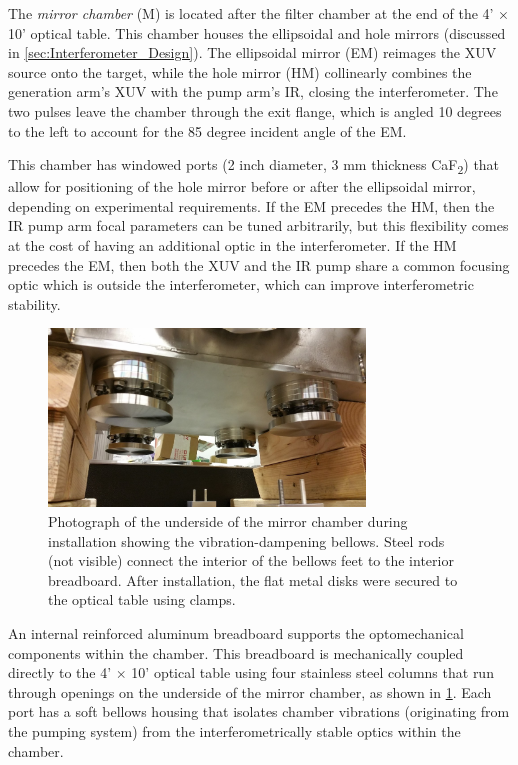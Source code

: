 The \textit{mirror chamber} (M) is located after the filter chamber at the end of the 4' $\times$ 10' optical table. This chamber houses the ellipsoidal and hole mirrors (discussed in \cref{sec:Interferometer_Design}). The ellipsoidal mirror (EM) reimages the XUV source onto the target, while the hole mirror (HM) collinearly combines the generation arm's XUV with the pump arm's IR, closing the interferometer. The two pulses leave the chamber through the exit flange, which is angled 10 degrees to the left to account for the 85 degree incident angle of the EM.

This chamber has windowed ports (2 inch diameter, 3 mm thickness CaF\textsubscript{2}) that allow for positioning of the hole mirror before or after the ellipsoidal mirror, depending on experimental requirements. If the EM precedes the HM, then the IR pump arm focal parameters can be tuned arbitrarily, but this flexibility comes at the cost of having an additional optic in the interferometer. If the HM precedes the EM, then both the XUV and the IR pump share a common focusing optic which is outside the interferometer, which can improve interferometric stability.

\begin{figure}
	\centering
	\includegraphics[width=0.75\textwidth]{figures/chap2/mirror_chamber-bellows_feet_lowres.jpg}
	\caption{Photograph of the underside of the mirror chamber during installation showing the vibration-dampening bellows. Steel rods (not visible) connect the interior of the bellows feet to the interior breadboard. After installation, the flat metal disks were secured to the optical table using clamps.}
	\label{fig:mirror_chamber_bellows_feet}
\end{figure}

An internal reinforced aluminum breadboard supports the optomechanical components within the chamber. This breadboard is mechanically coupled directly to the 4' $\times$ 10' optical table using four stainless steel columns that run through openings on the underside of the mirror chamber, as shown in \cref{fig:mirror_chamber_bellows_feet}. Each port has a soft bellows housing that isolates chamber vibrations (originating from the pumping system) from the interferometrically stable optics within the chamber. 

